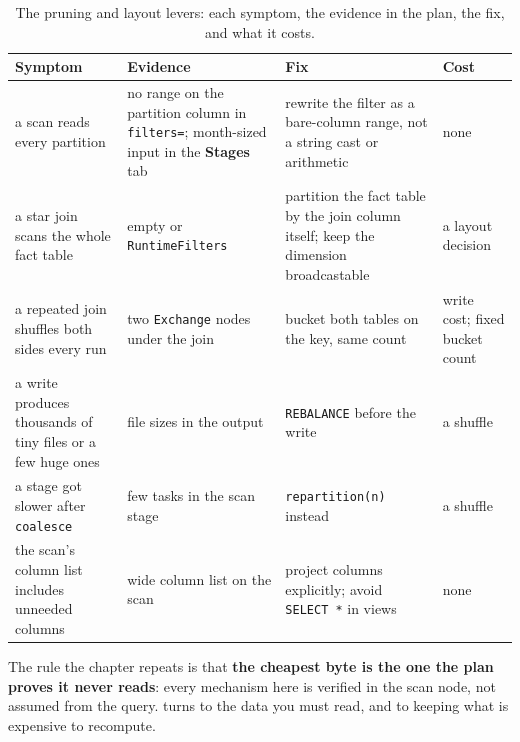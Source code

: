 \begin{table}[htbp]
\centering\footnotesize
\renewcommand{\arraystretch}{1.25}
\begin{tabular}{@{}P{3.3cm}P{3.9cm}P{3.7cm}P{3.1cm}@{}}
\toprule
\textbf{Symptom} & \textbf{Evidence} & \textbf{Fix} & \textbf{Cost} \\
\midrule
a scan reads every partition & no range on the partition column in \texttt{filters=}; month-sized input in the \textbf{Stages} tab & rewrite the filter as a bare-column range, not a string cast or arithmetic & none \\
a star join scans the whole fact table & empty or  \texttt{RuntimeFilters} & partition the fact table by the join column itself; keep the dimension broadcastable & a layout decision \\
a repeated join shuffles both sides every run & two \texttt{Exchange} nodes under the join & bucket both tables on the key, same count & write cost; fixed bucket count \\
a write produces thousands of tiny files or a few huge ones & file sizes in the output & \texttt{REBALANCE} before the write & a shuffle \\
a stage got slower after \texttt{coalesce} & few tasks in the scan stage & \texttt{repartition(n)} instead & a shuffle \\
the scan's column list includes unneeded columns & wide column list on the scan & project columns explicitly; avoid \texttt{SELECT *} in views & none \\
\bottomrule
\end{tabular}
\caption{The pruning and layout levers: each symptom, the evidence in the plan,
the fix, and what it costs.}
\label{tab:pruning-levers}
\end{table}

The rule the chapter repeats is that \textbf{the cheapest byte is the one the plan
proves it never reads}: every mechanism here is verified in the scan node, not
assumed from the query.  turns to the data you must read, and
to keeping what is expensive to recompute.

